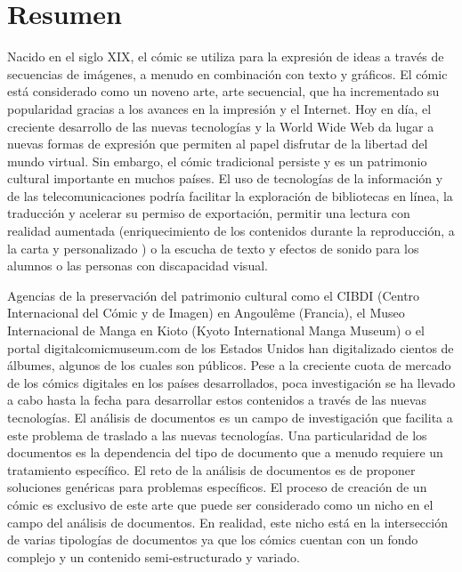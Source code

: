 \chapter*{Resumen}

Nacido en el siglo XIX, el cómic se utiliza para la expresión de ideas a través de secuencias de imágenes, a menudo en combinación con texto y gráficos. 
El cómic está considerado como un noveno arte, arte secuencial, que ha incrementado su popularidad gracias a los avances en la impresión y el Internet.
Hoy en día, el creciente desarrollo de las nuevas tecnologías y la World Wide Web da lugar a nuevas formas de expresión que permiten al papel disfrutar de la libertad del mundo virtual.
Sin embargo, el cómic tradicional persiste y es un patrimonio cultural importante en muchos países.
El uso de tecnologías de la información y de las telecomunicaciones podría facilitar la exploración de bibliotecas en línea, la traducción y acelerar su permiso de exportación, permitir una lectura con realidad aumentada (enriquecimiento de los contenidos durante la reproducción, a la carta y personalizado ) o la escucha de texto y efectos de sonido para los alumnos o las personas con discapacidad visual.

Agencias de la preservación del patrimonio cultural como el CIBDI (Centro Internacional del Cómic y de Imagen) en Angoulême (Francia), el Museo Internacional de Manga en Kioto (Kyoto International Manga Museum) o el portal digitalcomicmuseum.com de los Estados Unidos han digitalizado cientos de álbumes, algunos de los cuales son públicos.
Pese a la creciente cuota de mercado de los cómics digitales en los países desarrollados, poca investigación se ha llevado a cabo hasta la fecha para desarrollar estos contenidos a través de las nuevas tecnologías.
El análisis de documentos es un campo de investigación que facilita a este problema de traslado a las nuevas tecnologías.
Una particularidad de los documentos es la dependencia del tipo de documento que a menudo requiere un tratamiento específico.
El reto de la análisis de documentos es de proponer soluciones genéricas para problemas específicos.
El proceso de creación de un cómic es exclusivo de este arte que puede ser considerado como un nicho en el campo del análisis de documentos.
En realidad, este nicho está en la intersección de varias tipologías de documentos ya que los cómics cuentan con un fondo complejo y un contenido semi-estructurado y variado.

